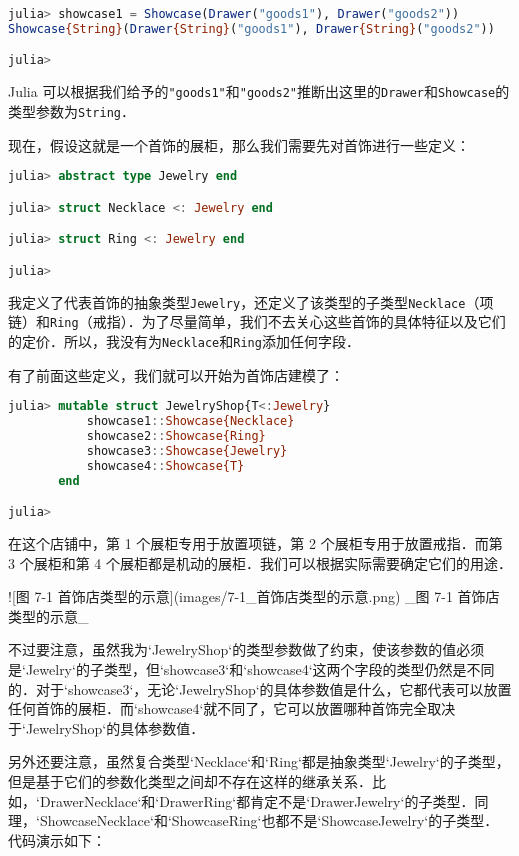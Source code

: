 \begin{lstlisting}[language=julia]
julia> showcase1 = Showcase(Drawer("goods1"), Drawer("goods2"))
Showcase{String}(Drawer{String}("goods1"), Drawer{String}("goods2"))

julia> 
\end{lstlisting}

Julia 可以根据我们给予的\verb|"goods1"|和\verb|"goods2"|推断出这里的\verb|Drawer|和\verb|Showcase|的类型参数为\verb|String|．

现在，假设这就是一个首饰的展柜，那么我们需要先对首饰进行一些定义：

\begin{lstlisting}[language=julia]
julia> abstract type Jewelry end

julia> struct Necklace <: Jewelry end

julia> struct Ring <: Jewelry end

julia> 
\end{lstlisting}

我定义了代表首饰的抽象类型\verb|Jewelry|，还定义了该类型的子类型\verb|Necklace|（项链）和\verb|Ring|（戒指）．为了尽量简单，我们不去关心这些首饰的具体特征以及它们的定价．所以，我没有为\verb|Necklace|和\verb|Ring|添加任何字段．

有了前面这些定义，我们就可以开始为首饰店建模了：

\begin{lstlisting}[language=julia]
julia> mutable struct JewelryShop{T<:Jewelry}
           showcase1::Showcase{Necklace}
           showcase2::Showcase{Ring}
           showcase3::Showcase{Jewelry}
           showcase4::Showcase{T}
       end

julia> 
\end{lstlisting}

在这个店铺中，第 1 个展柜专用于放置项链，第 2 个展柜专用于放置戒指．而第 3 个展柜和第 4 个展柜都是机动的展柜．我们可以根据实际需要确定它们的用途．

![图 7-1 首饰店类型的示意](images/7-1_首饰店类型的示意.png)
_图 7-1 首饰店类型的示意_

不过要注意，虽然我为`JewelryShop`的类型参数做了约束，使该参数的值必须是`Jewelry`的子类型，但`showcase3`和`showcase4`这两个字段的类型仍然是不同的．对于`showcase3`，无论`JewelryShop`的具体参数值是什么，它都代表可以放置任何首饰的展柜．而`showcase4`就不同了，它可以放置哪种首饰完全取决于`JewelryShop`的具体参数值．

另外还要注意，虽然复合类型`Necklace`和`Ring`都是抽象类型`Jewelry`的子类型，但是基于它们的参数化类型之间却不存在这样的继承关系．比如，`Drawer{Necklace}`和`Drawer{Ring}`都肯定不是`Drawer{Jewelry}`的子类型．同理，`Showcase{Necklace}`和`Showcase{Ring}`也都不是`Showcase{Jewelry}`的子类型．代码演示如下：

